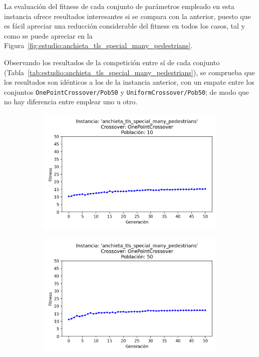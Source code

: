 La evaluación del fitness de cada conjunto de parámetros empleado en esta instancia ofrece resultados interesantes si se compara con la anterior, puesto que es fácil apreciar una reducción considerable del fitness en todos los casos, tal y como se puede apreciar en la Figura~\ref{fig:estudio:anchieta_tls_special_many_pedestrians}.  

Observando los resultados de la competición entre sí de cada conjunto (Tabla~\ref{tab:estudio:anchieta_tls_special_many_pedestrians}), se comprueba que los resultados son idénticos a los de la instancia anterior, con un empate entre los conjuntos \texttt{OnePointCrossover/Pob50} y \texttt{UniformCrossover/Pob50}; de modo que no hay diferencia entre emplear uno u otro.

\begin{figure}[h]
    \centering
    \begin{subfigure}[t]{.49\textwidth}
      \centering
      \includegraphics[width=\textwidth]{report/images/estudio/anchieta_tls_special_many_pedestrians-OnePointCrossover-10.png}
    \end{subfigure}
    \hfill
    \begin{subfigure}[t]{.49\textwidth}
      \centering
      \includegraphics[width=\textwidth]{report/images/estudio/anchieta_tls_special_many_pedestrians-OnePointCrossover-50.png}

\end{subfigure}
\end{figure}
